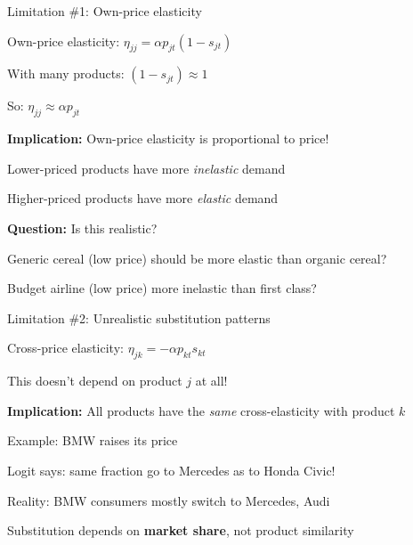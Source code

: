 \documentclass[notes,11pt, aspectratio=169]{beamer}
\newenvironment{wideitemize}{\itemize\addtolength{\itemsep}{10pt}}{\enditemize}
\begin{document}
\begin{frame}{Limitation \#1: Own-price elasticity}
	\begin{wideitemize}
		\item Own-price elasticity: $\eta_{jj} = \alpha p_{jt} (1 - s_{jt})$
		\item With many products: $(1 - s_{jt}) \approx 1$
		\item So: $\eta_{jj} \approx \alpha p_{jt}$
		\item \textbf{Implication:} Own-price elasticity is proportional to price! \pause
		\item Lower-priced products have more \textit{inelastic} demand
		\item Higher-priced products have more \textit{elastic} demand
		\item \textbf{Question:} Is this realistic?
		\begin{wideitemize}
			\vspace{3pt}
			\item Generic cereal (low price) should be more elastic than organic cereal?
			\item Budget airline (low price) more inelastic than first class?
		\end{wideitemize}
	\end{wideitemize}
\end{frame}

\begin{frame}{Limitation \#2: Unrealistic substitution patterns}
	\begin{wideitemize}
		\item Cross-price elasticity: $\eta_{jk} = -\alpha p_{kt} s_{kt}$
		\item This doesn't depend on product $j$ at all!
		\item \textbf{Implication:} All products have the \textit{same} cross-elasticity with product $k$ \pause
		\item Example: BMW raises its price
		\begin{wideitemize}
			\vspace{3pt}
			\item Logit says: same fraction go to Mercedes as to Honda Civic!
			\item Reality: BMW consumers mostly switch to Mercedes, Audi
		\end{wideitemize}
		\item Substitution depends on \textbf{market share}, not product similarity
	\end{wideitemize}
\end{frame}
\end{document}
